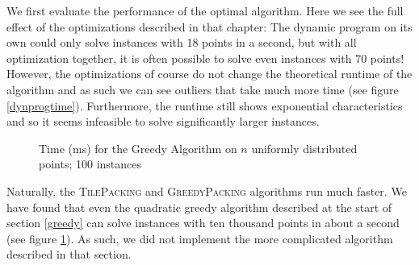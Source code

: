 \documentclass[11pt, a4paper, twocolumn]{article}
\begin{document}
We first evaluate the performance of the optimal algorithm.
Here we see the full effect of the optimizations described in that chapter:
The dynamic program on its own could only solve instances with 18 points in
a second, but with all optimization together, it is often possible to solve
even instances with 70 points! However, the optimizations of course do not
change the theoretical runtime of the algorithm and as such we can see
outliers that take much more time (see figure \ref{dynprogtime}).
Furthermore, the runtime still shows exponential characteristics and
so it seems infeasible to solve significantly larger instances.

\begin{figure}
\caption{Time (ms) for the Greedy Algorithm on $n$ uniformly distributed points; 100 instances}    
\label{greedytime}
\end{figure}

Naturally, the \textsc{TilePacking} and \textsc{GreedyPacking} algorithms run
much faster. We have found that even the quadratic greedy algorithm described at
the start of section \ref{greedy} can solve instances with ten thousand points
in about a second (see figure \ref{greedytime}). As such, we did not implement the more complicated algorithm
described in that section.

\printbibliography
\end{document}

